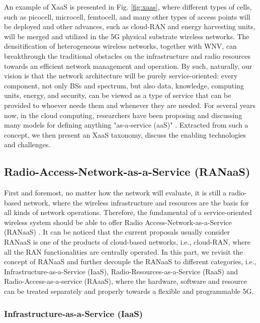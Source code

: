 \documentclass[12pt,draftclsnofoot,onecolumn]{IEEEtran}
\begin{document}
An example of XaaS is presented in Fig. \ref{fig:xaas}, where
different types of cells, such as picocell, microcell, femtocell,
and many other types of access points will be deployed and other
advances, such as cloud-RAN and energy harvesting units, will be
merged and utilized in the 5G physical substrate wireless
networks. The densitification of heterogeneous wireless networks,
together with WNV, can breakthrough the traditional obstacles on
the infrastructure and radio resources towards an efficient
network management and operation. By such, naturally, our vision
is that the network architecture will be purely service-oriented:
every component, not only BSs and spectrum, but also data,
knowledge, computing units, energy, and security, can be viewed as
a type of service that can be provided to whoever needs them and
whenever they are needed. For several years now, in the cloud
computing, researchers have been proposing and discussing many
models for defining anything "as-a-service (aaS)" \cite{Duan}.
Extracted from such a concept, we then present an XaaS taxonomy,
discuss the enabling technologies and challenges.

\subsection{Radio-Access-Network-as-a-Service (RANaaS)}

First and foremost, no matter how the network will evaluate,
it is still a radio-based network, where the wireless
infrastructure and resources are the basis for all kinds of
network operations. Therefore, the fundamental of a
service-oriented wireless system should be able to offer Radio
Access-Network-as-a-Service (RANaaS) \cite{Sabella2}.
It can be noticed that the current proposals usually
consider RANaaS is one of the products of cloud-based networks,
i.e., cloud-RAN, where all the RAN functionalities are centrally
operated. In this part, we revisit the concept of RANaaS and
further decouple the RANaaS to different categories, i.e.,
Infrastructure-as-a-Service (IaaS), Radio-Resources-as-a-Service
(RaaS) and Radio-Access-as-a-service (RAaaS), where the hardware,
software and resource can be treated separately and properly towards
a flexible and programmable 5G. \par


\subsubsection{Infrastructure-as-a-Service (IaaS)}
\end{document}

